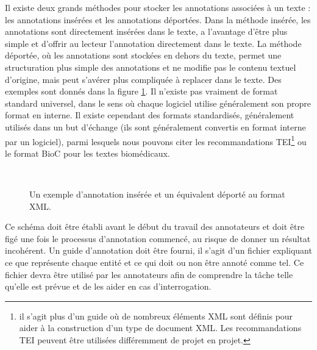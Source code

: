 \documentclass[12pt,a4paper,times,twoside,openright]{report}
\begin{document}
Il existe deux grands méthodes pour stocker les annotations associées à un texte : les annotations insérées et les annotations déportées. Dans la méthode insérée, les annotations sont directement insérées dans le texte, a l'avantage d'être plus simple et d'offrir au lecteur l'annotation directement dans le texte. La méthode déportée, où les annotations sont stockées en dehors du texte, permet une structuration plus simple des annotations et ne modifie pas le contenu textuel d'origine, mais peut s'avérer plus compliquée à replacer dans le texte. Des exemples sont donnés dans la figure \ref{fig:inline-vs-standoff}. Il n'existe pas vraiment de format standard universel, dans le sens où chaque logiciel utilise généralement son propre format en interne. Il existe cependant des formats standardisés, généralement utilisés dans un but d'échange (ils sont généralement convertis en format interne par un logiciel), parmi lesquels nous pouvons citer les recommandations TEI\footnote{il s'agit plus d'un guide où de nombreux éléments XML sont définis pour aider à la construction d'un type de document XML. Les recommandations TEI peuvent être utilisées différemment de projet en projet.} \citep{sperberg1994guidelines} ou le format BioC \citep{comeau2013bioc} pour les textes biomédicaux.

\begin{figure}[ht!]
\footnotesize
\begin{xml}\end{xml}
~
\begin{xml}\end{xml}
\caption{Un exemple d'annotation insérée et un équivalent déporté au format XML.}
\label{fig:inline-vs-standoff}
\end{figure}

Ce schéma doit être établi avant le début du travail des annotateurs et doit être figé une fois le processus d'annotation commencé, au risque de donner un résultat incohérent. Un guide d'annotation doit être fourni, il s'agit d'un fichier expliquant ce que représente chaque entité et ce qui doit ou non être annoté comme tel. Ce fichier devra être utilisé par les annotateurs afin de comprendre la tâche telle qu'elle est prévue et de les aider en cas d'interrogation.
\end{document}
